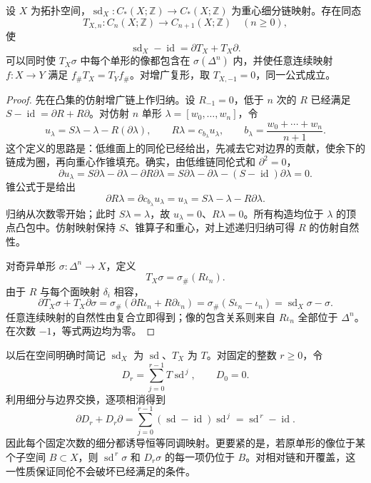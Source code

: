 \begin{proposition}\label{g2:prop:subdivision-chain-homotopy}
	设 \(X\) 为拓扑空间，\(\operatorname{sd}_X:C_*(X;\mathbb Z)\to C_*(X;\mathbb Z)\) 为重心细分链映射。存在同态
	\[
		T_{X,n}:C_n(X;\mathbb Z)\longrightarrow C_{n+1}(X;\mathbb Z)
		\quad(n\ge0),
	\]
	使
	\begin{equation}\label{g2:eq:subdivision-chain-homotopy}
		\operatorname{sd}_X-\operatorname{id}
		=\partial T_X+T_X\partial.
	\end{equation}
	可以同时使 \(T_X\sigma\) 中每个单形的像都包含在 \(\sigma(\Delta^n)\) 内，并使任意连续映射 \(f:X\to Y\) 满足 \(f_\#T_X=T_Yf_\#\)。对增广复形，取 \(T_{X,-1}=0\)，同一公式成立。
\end{proposition}
\begin{proof}
	先在凸集的仿射增广链上作归纳。设 \(R_{-1}=0\)，低于 \(n\) 次的 \(R\) 已经满足 \(S-\operatorname{id}=\partial R+R\partial\)。对仿射 \(n\) 单形 \(\lambda=[w_0,\ldots,w_n]\)，令
	\[
		u_\lambda=S\lambda-\lambda-R(\partial\lambda),
		\qquad
		R\lambda=c_{b_\lambda}u_\lambda,
		\qquad
		b_\lambda=\frac{w_0+\cdots+w_n}{n+1}.
	\]
	这个定义的思路是：低维面上的同伦已经给出，先减去它对边界的贡献，使余下的链成为圈，再向重心作锥填充。确实，由低维链同伦式和 \(\partial^2=0\)，
	\[
		\partial u_\lambda
		=S\partial\lambda-\partial\lambda-\partial R\partial\lambda
		=S\partial\lambda-\partial\lambda
			-(S-\operatorname{id})\partial\lambda
		=0.
	\]
	锥公式于是给出
	\[
		\partial R\lambda
		=\partial c_{b_\lambda}u_\lambda=u_\lambda
		=S\lambda-\lambda-R\partial\lambda.
	\]
	归纳从次数零开始；此时 \(S\lambda=\lambda\)，故 \(u_\lambda=0\)、\(R\lambda=0\)。所有构造均位于 \(\lambda\) 的顶点凸包中。仿射映射保持 \(S\)、锥算子和重心，对上述递归归纳可得 \(R\) 的仿射自然性。

	对奇异单形 \(\sigma:\Delta^n\to X\)，定义
	\[
		T_X\sigma=\sigma_\#(R\iota_n).
	\]
	由于 \(R\) 与每个面映射 \(\delta_i\) 相容，
	\[
		\partial T_X\sigma+T_X\partial\sigma
		=\sigma_\#(\partial R\iota_n+R\partial\iota_n)
		=\sigma_\#(S\iota_n-\iota_n)
		=\operatorname{sd}_X\sigma-\sigma.
	\]
	任意连续映射的自然性由复合立即得到；像的包含关系则来自 \(R\iota_n\) 全部位于 \(\Delta^n\)。在次数 \(-1\)，等式两边均为零。
\end{proof}

以后在空间明确时简记 \(\operatorname{sd}_X\) 为 \(\operatorname{sd}\)、\(T_X\) 为 \(T\)。对固定的整数 \(r\ge0\)，令
\begin{equation}\label{g2:eq:iterated-subdivision-homotopy}
	D_r=\sum_{j=0}^{r-1}T\operatorname{sd}^{\,j},
	\qquad D_0=0.
\end{equation}
利用细分与边界交换，逐项相消得到
\[
	\partial D_r+D_r\partial
	=\sum_{j=0}^{r-1}(\operatorname{sd}-\operatorname{id})
		\operatorname{sd}^{\,j}
	=\operatorname{sd}^{\,r}-\operatorname{id}.
\]
因此每个固定次数的细分都诱导恒等同调映射。更要紧的是，若原单形的像位于某个子空间 \(B\subset X\)，则 \(\operatorname{sd}^{\,r}\sigma\) 和 \(D_r\sigma\) 的每一项仍位于 \(B\)。对相对链和开覆盖，这一性质保证同伦不会破坏已经满足的条件。

